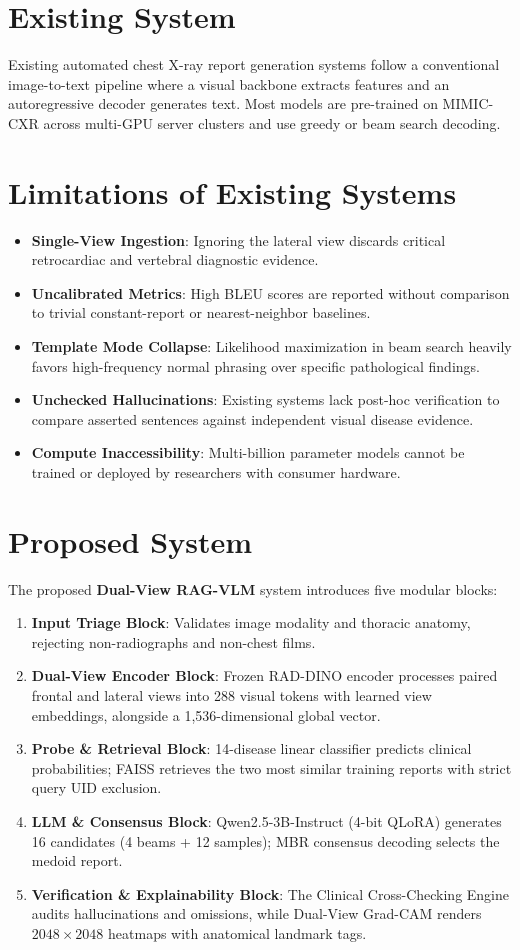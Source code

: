 \documentclass[12pt,a4paper]{report}
\begin{document}
\section{Existing System}
Existing automated chest X-ray report generation systems follow a conventional image-to-text pipeline where a visual backbone extracts features and an autoregressive decoder generates text. Most models are pre-trained on MIMIC-CXR across multi-GPU server clusters and use greedy or beam search decoding.

\section{Limitations of Existing Systems}
\begin{itemize}
    \item \textbf{Single-View Ingestion}: Ignoring the lateral view discards critical retrocardiac and vertebral diagnostic evidence.
    \item \textbf{Uncalibrated Metrics}: High BLEU scores are reported without comparison to trivial constant-report or nearest-neighbor baselines.
    \item \textbf{Template Mode Collapse}: Likelihood maximization in beam search heavily favors high-frequency normal phrasing over specific pathological findings.
    \item \textbf{Unchecked Hallucinations}: Existing systems lack post-hoc verification to compare asserted sentences against independent visual disease evidence.
    \item \textbf{Compute Inaccessibility}: Multi-billion parameter models cannot be trained or deployed by researchers with consumer hardware.
\end{itemize}

\section{Proposed System}
The proposed \textbf{Dual-View RAG-VLM} system introduces five modular blocks:
\begin{enumerate}
    \item \textbf{Input Triage Block}: Validates image modality and thoracic anatomy, rejecting non-radiographs and non-chest films.
    \item \textbf{Dual-View Encoder Block}: Frozen RAD-DINO encoder processes paired frontal and lateral views into 288 visual tokens with learned view embeddings, alongside a 1,536-dimensional global vector.
    \item \textbf{Probe \& Retrieval Block}: 14-disease linear classifier predicts clinical probabilities; FAISS retrieves the two most similar training reports with strict query UID exclusion.
    \item \textbf{LLM \& Consensus Block}: Qwen2.5-3B-Instruct (4-bit QLoRA) generates 16 candidates (4 beams + 12 samples); MBR consensus decoding selects the medoid report.
    \item \textbf{Verification \& Explainability Block}: The Clinical Cross-Checking Engine audits hallucinations and omissions, while Dual-View Grad-CAM renders $2048 \times 2048$ heatmaps with anatomical landmark tags.
\end{enumerate}
\end{document}

